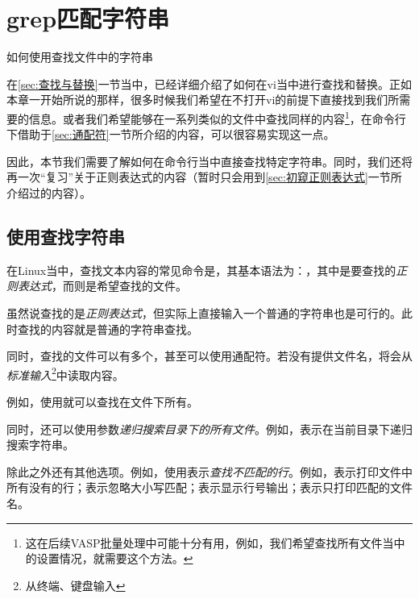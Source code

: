\section{grep匹配字符串}\label{sec:grep匹配字符串}

\begin{Abstract}
    \item 如何使用查找文件中的字符串
\end{Abstract}

在\ref{sec:查找与替换}一节当中，已经详细介绍了如何在vi当中进行查找和替换。正如本章一开始所说的那样，很多时候我们希望在不打开vi的前提下直接找到我们所需要的信息。或者我们希望能够在一系列类似的文件中查找同样的内容\footnote{这在后续VASP批量处理中可能十分有用，例如，我们希望查找所有文件当中的设置情况，就需要这个方法。}，在命令行下借助于\ref{sec:通配符}一节所介绍的内容，可以很容易实现这一点。

因此，本节我们需要了解如何在命令行当中直接查找特定字符串。同时，我们还将再一次“复习”关于正则表达式的内容（暂时只会用到\ref{sec:初窥正则表达式}一节所介绍过的内容）。

\subsection{使用查找字符串}\label{subsec:grep匹配字符串-使用grep查找字符串}

在Linux当中，查找文本内容的常见命令是，其基本语法为：，其中\code{[匹配的内容]}是要查找的\emph{正则表达式}，而\code{[文件名]}则是希望查找的文件。

\begin{attention}
    虽然说查找的是\emph{正则表达式}，但实际上直接输入一个普通的字符串也是可行的。此时查找的内容就是普通的字符串查找。

    同时，查找的文件可以有多个，甚至可以使用通配符。若没有提供文件名，将会从\emph{标准输入}\footnote{从终端、键盘输入}中读取内容。
\end{attention}

例如，使用就可以查找在文件下所有。

同时，还可以使用参数\emph{递归搜索目录下的所有文件}。例如，表示在当前目录下递归搜索字符串。

除此之外还有其他选项。例如，使用表示\emph{查找不匹配的行}。例如，表示打印文件中所有没有的行；表示忽略大小写匹配；表示显示行号输出；表示只打印匹配的文件名。

